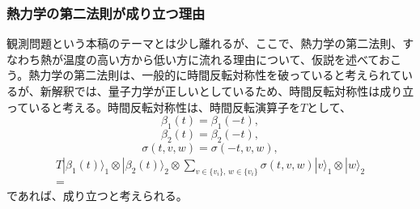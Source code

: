 \subsubsection{熱力学の第二法則が成り立つ理由}
観測問題という本稿のテーマとは少し離れるが、ここで、熱力学の第二法則、すなわち熱が温度の高い方から低い方に流れる理由について、仮説を述べておこう。熱力学の第二法則は、一般的に時間反転対称性を破っていると考えられているが、新解釈では、量子力学が正しいとしているため、時間反転対称性は成り立っていると考える。時間反転対称性は、時間反転演算子を$T$として、
\begin{equation}
    \beta_1(t) = \beta_1(-t),
\end{equation}
\begin{equation}
    \beta_2(t) = \beta_2(-t),
\end{equation}
\begin{equation}
    \sigma(t,v,w) = \sigma(-t,v,w),
\end{equation}
\begin{equation}
\begin{aligned}
 T|\beta_1(t) \rangle_1 \otimes |\beta_2(t)\rangle_2 \otimes   \sum_{v \in \{v_i\} ,\, w \in \{v_i\}} \sigma(t,v,w)|v\rangle_1 \otimes |w\rangle_2 \\
 =
\end{aligned}
\end{equation}
であれば、成り立つと考えられる。
